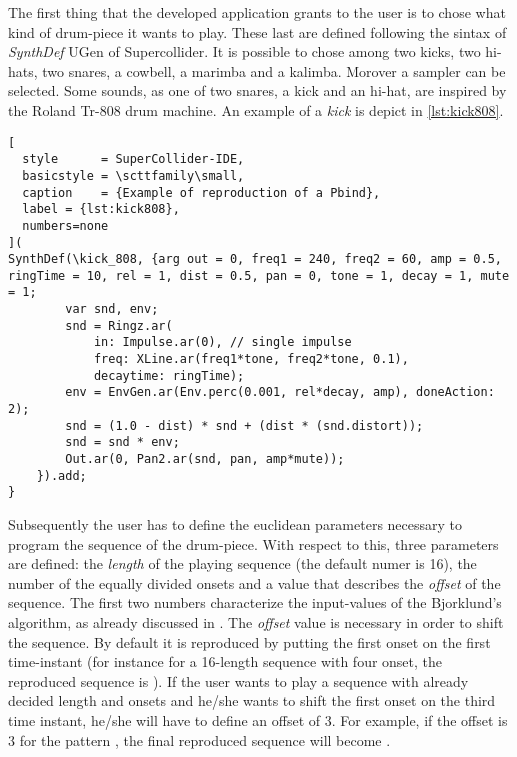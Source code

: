 \documentclass[main.tex]{subfiles}
\begin{document}
The first thing that the developed application grants to the user is to chose what kind of drum-piece it wants to play. These last are defined following the sintax of \textit{SynthDef} UGen of Supercollider. It is possible to chose among two kicks, two hi-hats, two snares, a cowbell, a marimba and a kalimba. Morover a sampler can be selected. Some sounds, as one of two snares, a kick and an hi-hat, are inspired by the Roland Tr-808 drum machine. An example of a \textit{kick} is depict in \autoref{lst:kick808}.\\
\begin{lstlisting}[
  style      = SuperCollider-IDE,
  basicstyle = \scttfamily\small,
  caption    = {Example of reproduction of a Pbind},
  label = {lst:kick808},
  numbers=none
](
SynthDef(\kick_808, {arg out = 0, freq1 = 240, freq2 = 60, amp = 0.5, ringTime = 10, rel = 1, dist = 0.5, pan = 0, tone = 1, decay = 1, mute = 1;
		var snd, env;
		snd = Ringz.ar(
			in: Impulse.ar(0), // single impulse
			freq: XLine.ar(freq1*tone, freq2*tone, 0.1),
			decaytime: ringTime);
		env = EnvGen.ar(Env.perc(0.001, rel*decay, amp), doneAction: 2);
		snd = (1.0 - dist) * snd + (dist * (snd.distort));
		snd = snd * env;
		Out.ar(0, Pan2.ar(snd, pan, amp*mute));
	}).add;
}
\end{lstlisting}
Subsequently the user has to define the euclidean parameters necessary to program the sequence of the drum-piece. With respect to this, three parameters are defined: the \textit{length} of the playing sequence (the default numer is 16), the number of the equally divided onsets and a value that describes the \textit{offset} of the sequence. The first two numbers characterize the input-values of the Bjorklund's algorithm, as already discussed in . The \textit{offset} value is necessary in order to shift the sequence. By default it is reproduced by putting the first onset on the first time-instant (for instance for a 16-length sequence with four onset, the reproduced sequence is \begin{math}[1000100010001000]\end{math}). If the user wants to play a sequence with already decided length and onsets and he/she wants to shift the first onset on the third time instant, he/she will have to define an offset of \begin{math}3\end{math}. For example, if the offset is \begin{math}3\end{math} for the pattern \begin{math}[1000100010001000]\end{math}, the final reproduced sequence will become \begin{math}[0001000100010001]\end{math}.\\
\end{document}
